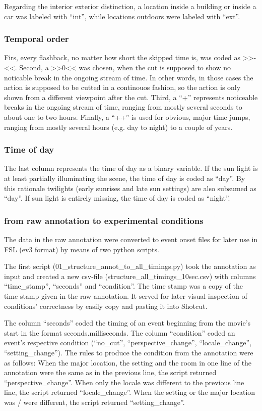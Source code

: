 \documentclass[10pt,a4paper,twocolumn]{article}
\begin{document}
Regarding the interior exterior distinction, a location inside a building
or inside a car was labeled with ``int'', while locations outdoors
were labeled with ``ext''. 


\subsubsection{Temporal order}

Firs, every flashback, no matter how short the skipped time is, was
coded as >>-<<. Second, a >>0<< was chosen, when the cut is supposed
to show no noticable break in the ongoing stream of time. In other
words, in those cases the action is supposed to be cutted in a continouos
fashion, so the action is only shown from a different viewpoint after
the cut. Third, a ``+'' represents noticeable breaks in the ongoing
stream of time, ranging from mostly several seconds to about one to
two hours. Finally, a ``++'' is used for obvious, major time jumps,
ranging from mostly several hours (e.g. day to night) to a couple
of years.


\subsubsection{Time of day }

The last column represents the time of day as a binary variable. If
the sun light is at least partially illuminating the scene, the time
of day is coded as ``day''. By this rationale twilights (early sunrises
and late sun settings) are also subsumed as ``day''. If sun light
is entirely missing, the time of day is coded as ``night''. 


\subsubsection{from raw annotation to experimental conditions}

The data in the raw annotation were converted to event onset files
for later use in FSL (ev3 format) by means of two python scripts. 

The first script (01\_structure\_annot\_to\_all\_timings.py) took
the annotation as input and created a new csv-file (structure\_all\_timings\_10sec.csv)
with columns ``time\_stamp'', ``seconds'' and ``condition''.
The time stamp was a copy of the time stamp given in the raw annotation.
It served for later visual inspection of conditions' correctness by
easily copy and pasting it into Shotcut. 

The column ``seconds'' coded the timing of an event beginning from
the movie's start in the format seconds.milliseconds. The column ``condition''
coded an event's respective condition (``no\_cut'', ``perspective\_change'',
``locale\_change'', ``setting\_change''). The rules to produce
the condition from the annotation were as follows: When the major
location, the setting and the room in one line of the annotation were
the same as in the previous line, the script returned ``perspective\_change''.
When only the locale was different to the previous line line, the
script returned ``locale\_change''. When the setting or the major
location was / were different, the script returned ``setting\_change''. 
\end{document}
